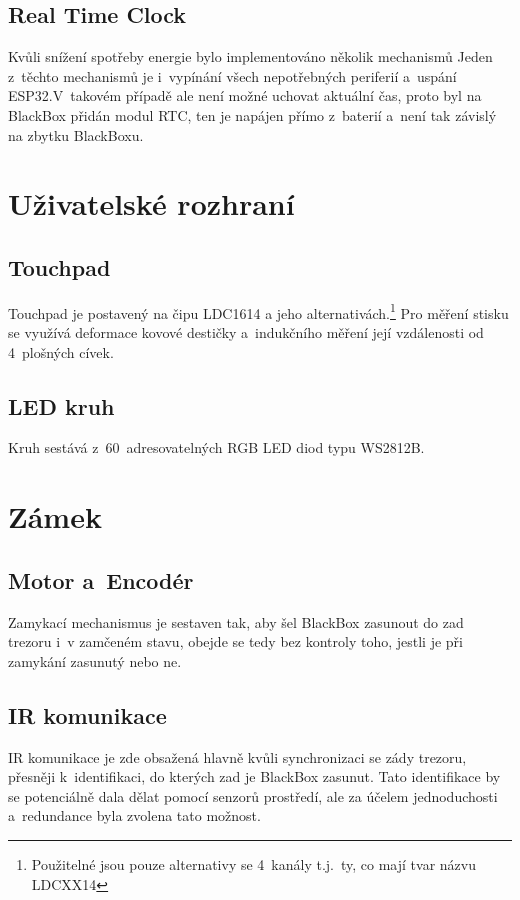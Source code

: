 \subsection{Real Time Clock}
Kvůli snížení spotřeby energie bylo implementováno několik mechanismů
Jeden z~těchto mechanismů je i~vypínání všech nepotřebných periferií a~uspání ESP32.V~takovém případě ale není možné uchovat aktuální čas, proto byl na BlackBox přidán modul RTC, ten je napájen přímo z~baterií a~není tak závislý na zbytku BlackBoxu.

\section{Uživatelské rozhraní}

\subsection{Touchpad}
Touchpad je postavený na čipu LDC1614 a jeho alternativách.\footnote{Použitelné jsou pouze alternativy se 4~kanály t.j.~ty, co mají tvar názvu LDCXX14}
Pro měření stisku se využívá deformace kovové destičky a~indukčního měření její vzdálenosti od 4~plošných cívek.

\subsection{LED kruh}
Kruh sestává z~60~adresovatelných RGB LED diod typu WS2812B.

\section{Zámek}

\subsection{Motor a~Encodér}
Zamykací mechanismus je sestaven tak, aby šel BlackBox zasunout do zad trezoru i~v zamčeném stavu, obejde se tedy bez kontroly toho, jestli je při zamykání zasunutý nebo ne.

\subsection{IR komunikace}
IR komunikace je zde obsažená hlavně kvůli synchronizaci se zády trezoru, přesněji k~identifikaci, do kterých zad je BlackBox zasunut.
Tato identifikace by se potenciálně dala dělat pomocí senzorů prostředí, ale za účelem jednoduchosti a~redundance byla zvolena tato možnost.


